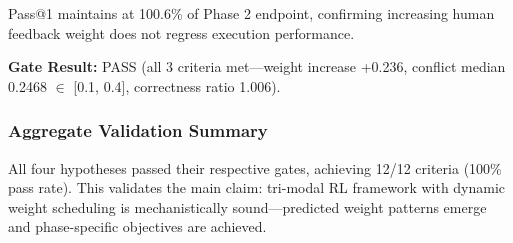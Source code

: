 Pass@1 maintains at 100.6\% of Phase 2 endpoint, confirming increasing human feedback weight does not regress execution performance.

\textbf{Gate Result:} PASS (all 3 criteria met---weight increase +0.236, conflict median 0.2468 $\in$ [0.1, 0.4], correctness ratio 1.006).

\subsubsection{Aggregate Validation Summary}

\begin{table}[htbp]
\centering
{}
\end{table}

All four hypotheses passed their respective gates, achieving 12/12 criteria (100\% pass rate). This validates the main claim: tri-modal RL framework with dynamic weight scheduling is mechanistically sound---predicted weight patterns emerge and phase-specific objectives are achieved.
